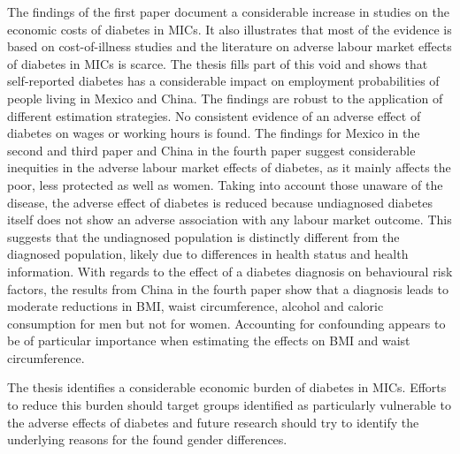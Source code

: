 The findings of the first paper document a considerable increase in studies on the economic costs of diabetes in \acp{MIC}. It also illustrates that most of the evidence is based on cost-of-illness studies and the literature on adverse labour market effects of diabetes in \acp{MIC} is scarce. The thesis fills part of this void and shows that self-reported diabetes has a considerable impact on employment probabilities of people living in Mexico and China. The findings are robust to the application of different estimation strategies. No consistent evidence of an adverse effect of diabetes on wages or working hours is found. The findings for Mexico in the second and third paper and China in the fourth paper suggest considerable inequities in the adverse labour market effects of diabetes, as it mainly affects the poor, less protected as well as women. Taking into account those unaware of the disease, the adverse effect of diabetes is reduced because undiagnosed diabetes itself does not show an adverse association with any labour market outcome. This suggests that the undiagnosed population is distinctly different from the diagnosed population, likely due to differences in health status and health information. With regards to the effect of a diabetes diagnosis on behavioural risk factors, the results from China in the fourth paper show that a diagnosis leads to moderate reductions in \ac{BMI}, waist circumference, alcohol and caloric consumption for men but not for women. Accounting for confounding appears to be of particular importance when estimating the effects on \ac{BMI} and waist circumference.

The thesis identifies a considerable economic burden of diabetes in \acp{MIC}. Efforts to reduce this burden should target groups identified as particularly vulnerable to the adverse effects of diabetes and future research should try to identify the underlying reasons for the found gender differences.



